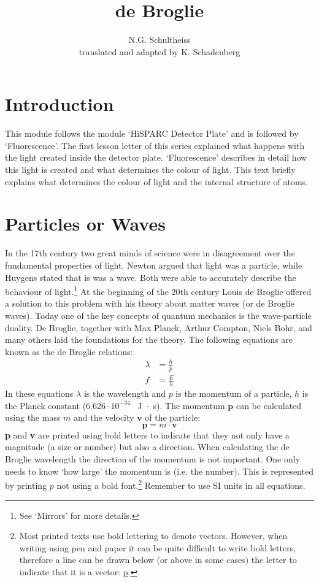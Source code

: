 \documentclass[12pt,a4paper]{article}
\author{N.G. Schultheiss \\ translated and adapted by K. Schadenberg}
\date{}
\title{de Broglie}
\numberwithin{equation}{section}
\numberwithin{figure}{section}
\numberwithin{table}{section}
\begin{document}
\maketitle

\section{Introduction}
This module follows the module `HiSPARC Detector Plate' and is followed by `Fluorescence'. The first lesson letter of this series explained what happens with the light created inside the detector plate. `Fluorescence' describes in detail how this light is created and what determines the colour of light. This text briefly explains what determines the colour of light and the internal structure of atoms. 

\section{Particles or Waves}
In the 17th century two great minds of science were in disagreement over the fundamental properties of light. Newton argued that light was a particle, while Huygens stated that is was a wave. Both were able to accurately describe the behaviour of light.\footnote{See `Mirrors' for more details.} At the beginning of the 20th century Louis de Broglie offered a solution to this problem with his theory about matter waves (or de Broglie waves). Today one of the key concepts of quantum mechanics is the wave-particle duality. De Broglie, together with Max Planck, Arthur Compton, Niels Bohr, and many others laid the foundations for the theory.
The following equations are known as the de Broglie relations:
\begin{align}
\lambda &= \frac{h}{p} \label{eq:broglie_1} \\ 
f &= \frac{E}{h} \label{eq:broglie_2}
\end{align}
In these equations $\lambda$ is the wavelength and $p$ is the momentum of a particle, $h$ is the Planck constant ($6.626 \cdot 10^{-34}$ ~J~$\cdot$~s). The momentum $\textbf{p}$ can be calculated using the mass $m$ and the velocity $\textbf{v}$ of the particle:
\begin{equation}
\textbf{p}= m \cdot \textbf{v} \label{eq:momentum} 
\end{equation}
\textbf{p} and \textbf{v} are printed using bold letters to indicate that they not only have a magnitude (a size or number) but also a direction. When calculating the de Broglie wavelength the direction of the momentum is not important. One only needs to know `how large' the momentum is (i.e. the number). This is represented by printing $p$ not using a bold font.\footnote{Most printed texts use bold lettering to denote vectors. However, when writing using pen and paper it can be quite difficult to write bold letters, therefore a line can be drawn below (or above in some cases) the letter to indicate that it is a vector: \underline{p}.} Remember to use SI units in all equations.
\end{document}

